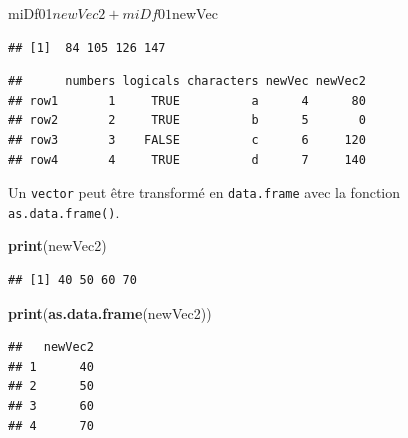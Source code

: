 \documentclass[twoside,symmetric]{book}
\newenvironment{Shaded}{}{}
\newcommand{\DecValTok}[1]{#1}
\newcommand{\KeywordTok}[1]{\textbf{#1}}
\newcommand{\NormalTok}[1]{#1}
\newcommand{\OperatorTok}[1]{#1}
\newcommand{\StringTok}[1]{#1}
\begin{document}
\begin{Shaded}
\begin{Highlighting}[]
\NormalTok{miDf01}\OperatorTok{$}\NormalTok{newVec2 }\OperatorTok{+}\StringTok{ }\NormalTok{miDf01}\OperatorTok{$}\NormalTok{newVec}
\end{Highlighting}
\end{Shaded}

\begin{verbatim}
## [1]  84 105 126 147
\end{verbatim}

\begin{Shaded}
\end{Shaded}

\begin{verbatim}
##      numbers logicals characters newVec newVec2
## row1       1     TRUE          a      4      80
## row2       2     TRUE          b      5       0
## row3       3    FALSE          c      6     120
## row4       4     TRUE          d      7     140
\end{verbatim}

Un \texttt{vector} peut être transformé en \texttt{data.frame} avec la fonction \texttt{as.data.frame()}.

\begin{Shaded}
\begin{Highlighting}[]
\KeywordTok{print}\NormalTok{(newVec2)}
\end{Highlighting}
\end{Shaded}

\begin{verbatim}
## [1] 40 50 60 70
\end{verbatim}

\begin{Shaded}
\begin{Highlighting}[]
\KeywordTok{print}\NormalTok{(}\KeywordTok{as.data.frame}\NormalTok{(newVec2))}
\end{Highlighting}
\end{Shaded}

\begin{verbatim}
##   newVec2
## 1      40
## 2      50
## 3      60
## 4      70
\end{verbatim}
\end{document}
